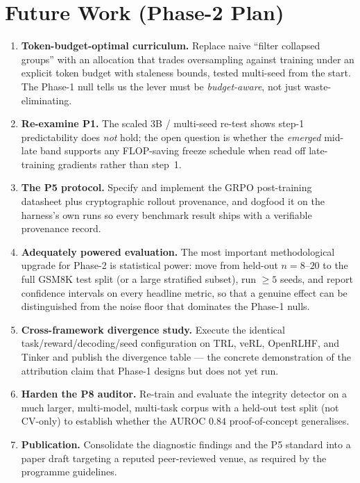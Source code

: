 \documentclass[12pt,a4paper]{report}
\begin{document}
\section{Future Work (Phase-2 Plan)}
\begin{enumerate}[leftmargin=1.6em,itemsep=3pt]
  \item \textbf{Token-budget-optimal curriculum.} Replace naive ``filter collapsed
  groups'' with an allocation that trades oversampling against training under an
  explicit token budget with staleness bounds, tested multi-seed from the start. The
  Phase-1 null tells us the lever must be \emph{budget-aware}, not just
  waste-eliminating.
  \item \textbf{Re-examine P1.} The scaled 3B / multi-seed re-test shows step-1
  predictability does \emph{not} hold; the open question is whether the \emph{emerged}
  mid-late band supports any FLOP-saving freeze schedule when read off late-training
  gradients rather than step~1.
  \item \textbf{The P5 protocol.} Specify and implement the GRPO post-training
  datasheet plus cryptographic rollout provenance, and dogfood it on the harness's own
  runs so every benchmark result ships with a verifiable provenance record.
  \item \textbf{Adequately powered evaluation.} The most important methodological
  upgrade for Phase-2 is statistical power: move from held-out $n=8$--$20$ to the full
  GSM8K test split (or a large stratified subset), run $\ge 5$ seeds, and report
  confidence intervals on every headline metric, so that a genuine effect can be
  distinguished from the noise floor that dominates the Phase-1 nulls.
  \item \textbf{Cross-framework divergence study.} Execute the identical
  task/reward/decoding/seed configuration on TRL, veRL, OpenRLHF, and Tinker and publish
  the divergence table --- the concrete demonstration of the attribution claim that
  Phase-1 designs but does not yet run.
  \item \textbf{Harden the P8 auditor.} Re-train and evaluate the integrity detector on a
  much larger, multi-model, multi-task corpus with a held-out test split (not CV-only) to
  establish whether the AUROC $0.84$ proof-of-concept generalises.
  \item \textbf{Publication.} Consolidate the diagnostic findings and the P5 standard
  into a paper draft targeting a reputed peer-reviewed venue, as required by the
  programme guidelines.
\end{enumerate}
\end{document}
